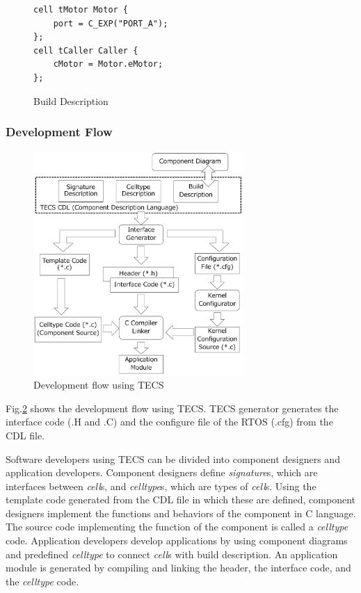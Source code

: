 \documentclass[JIP]{ipsj_v2/UTF8/ipsj}
\begin{document}
\begin{description}
\begin{figure}[t]
\centering
\begin{lstlisting}
cell tMotor Motor {
    port = C_EXP("PORT_A");
};
cell tCaller Caller {
    cMotor = Motor.eMotor;
};
\end{lstlisting}
\caption{Build Description}
\label{build}
\end{figure}

\end{description}

\subsubsection{Development Flow}

\begin{figure}[t]
    \centering
    \includegraphics[width=8cm,clip]{figure/TECSFlow.pdf}
    \caption{Development flow using TECS}
    \label{fig:TECSFlow}
\end{figure}

Fig.\ref{fig:TECSFlow} shows the development flow using TECS.
TECS generator generates the interface code (.H and .C) and the configure file of the RTOS (.cfg) from the CDL file.

Software developers using TECS can be divided into component designers and application developers.
Component designers define {\it signature}s, which are interfaces between {\it cell}s, and {\it celltype}s, which are types of {\it cell}s.
Using the template code generated from the CDL file in which these are defined, component designers implement the functions and behaviors of the component in C language.
The source code implementing the function of the component is called a {\it celltype} code.
Application developers develop applications by using component diagrams and predefined {\it celltype} to connect {\it cell}s with build description.
An application module is generated by compiling and linking the header, the interface code, and the {\it celltype} code.
\end{document}
